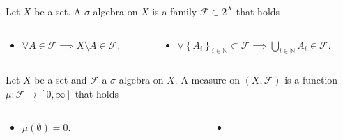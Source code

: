 \begin{frame}
	\frametitle{\secname}

	\begin{definition}
		Let $X$ be a set.
		A \alert{$\sigma$-algebra} on $X$ is a family
		$\mathcal{F}\subset 2^{X}$ that holds

		\begin{columns}
			\begin{column}{0.48\textwidth}
				\begin{itemize}
					\item

					      \begin{math}
						      \forall A\in\mathcal{F}\implies
						      X\setminus A\in\mathcal{F}
					      \end{math}.
				\end{itemize}
			\end{column}
			\begin{column}{0.48\textwidth}
				\begin{itemize}
					\item

					      \begin{math}
						      \forall
						      \left\{A_{i}\right\}_{i\in\mathds{N}}\subset
						      \mathcal{F}\implies
						      \bigcup\limits_{i\in\mathds{N}}A_{i}\in\mathcal{F}
					      \end{math}.
				\end{itemize}
			\end{column}
		\end{columns}
	\end{definition}

	\begin{definition}[Measure]
		Let $X$ be a set and $\mathcal{F}$ a $\sigma$-algebra on $X$.
		A \alert{measure} on $\left(X,\mathcal{F}\right)$ is a function
		\begin{math}
			\mu\colon\mathcal{F}\to\left[0,\infty\right]
		\end{math}
		that holds

		\begin{columns}
			\begin{column}{0.18\textwidth}
				\begin{itemize}
					\item

					      \begin{math}
						      \mu\left(\emptyset\right)=
						      0.
					      \end{math}
				\end{itemize}
			\end{column}
			\begin{column}{0.78\textwidth}
				\begin{itemize}
					\item


\end{itemize}
\end{column}
\end{columns}
\end{definition}
\end{frame}
